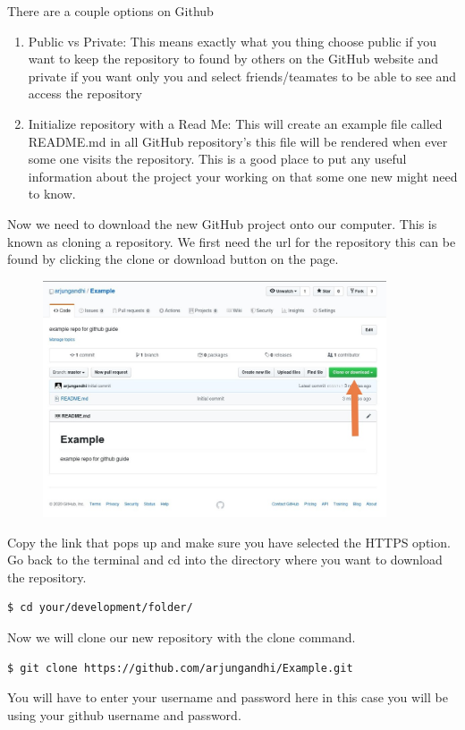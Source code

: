 \documentclass{article}
\begin{document}
\newline\newline
There are a couple options on Github
\begin{enumerate}
    \item Public vs Private: This means exactly what you thing choose public if you want to keep the repository to found by others on the GitHub website and private if you want only you and select friends/teamates to be able to see and access the repository
    \item Initialize repository with a Read Me: This will create an example file called README.md in all GitHub repository's this file will be rendered when ever some one visits the repository. This is a good place to put any useful information about the project your working on that some one new might need to know.
\end{enumerate}
\newpage
Now we need to download the new GitHub project onto our computer. This is known as cloning a repository.
\newline
\newline
We first need the url for the repository this can be found by clicking the clone or download button on the page.
\begin{figure}[H]
    \includegraphics[width=4in]{images/clone.jpg}
\end{figure}
Copy the link that pops up and make sure you have selected the HTTPS option.
\newline\newline
Go back to the terminal and cd into the directory where you want to download the repository.
\begin{lstlisting}[language=bash]
$ cd your/development/folder/
\end{lstlisting}
Now we will clone our new repository with the clone command.
\begin{lstlisting}[language=bash]
$ git clone https://github.com/arjungandhi/Example.git
\end{lstlisting}
You will have to enter your username and password here in this case you will be using your github username and password.
\end{document}
